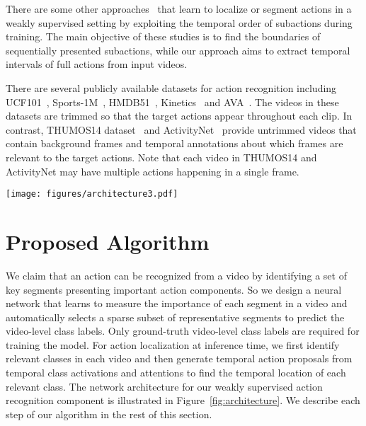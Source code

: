 \documentclass[10pt,twocolumn,letterpaper]{article}
\begin{document}
There are some other approaches~\cite{bojanowski14weakly,huang16connectionist,rechard17weakly} that learn to localize or segment actions in a weakly supervised setting by exploiting the temporal order of subactions during training.
The main objective of these studies is to find the boundaries of sequentially presented subactions, while our approach aims to extract temporal intervals of full actions from input videos.

There are several publicly available datasets for action recognition including UCF101~\cite{soomro12ucf101}, Sports-1M~\cite{karpathy14large}, HMDB51~\cite{kuehne11hmdb}, Kinetics~\cite{kay2017kinetics} and AVA~\cite{gu17ava}.
The videos in these datasets are trimmed so that the target actions appear throughout each clip.
In contrast, THUMOS14 dataset~\cite{jiang14thumos} and ActivityNet~\cite{heilbron15activitynet} provide untrimmed videos that contain background frames and temporal annotations about which frames are relevant to the target actions.
Note that each video in THUMOS14 and ActivityNet may have multiple actions happening in a single frame.
 


\begin{figure*}[t]
\captionsetup{font=small}
\centering
\texttt{[image: figures/architecture3.pdf]}
\caption{Network architecture for our weakly supervised temporal action localization model.  We first extract feature representations for a set of uniformly sampled video segments using a pretrained network. The attention module computes class-agnostic attention weights for each segment, which are used to generate a video-level representation via weighted temporal average pooling. The representation is given to the classification module that can be trained with regular cross entropy loss with video-level labels. An $\ell_1$ loss is placed on the attention weights to enforce sparse attentions.}
\label{fig:architecture}
\end{figure*}

\section{Proposed Algorithm}
\label{sec:proposed}

We claim that an action can be recognized from a video by identifying a set of key segments presenting important action components. So we design a neural network that learns to measure the importance of each segment in a video and automatically selects a sparse subset of representative segments to predict the video-level class labels. Only ground-truth video-level class labels are required for training the model.
For action localization at inference time, we first identify relevant classes in each video and then generate temporal action proposals from temporal class activations and attentions to find the temporal location of each relevant class.
The network architecture for our weakly supervised action recognition component is illustrated in Figure~\ref{fig:architecture}.
We describe each step of our algorithm in the rest of this section.
\end{document}
